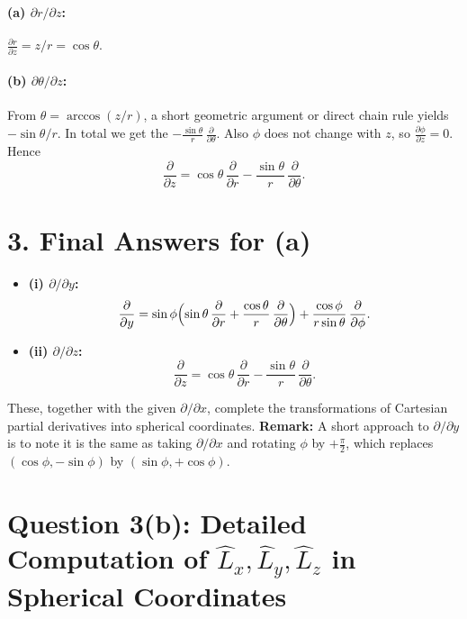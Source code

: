 \documentclass[12pt]{article}
\begin{document}
\paragraph{(a) $\partial r /\partial z$:}
\(
\frac{\partial r}{\partial z} = z/r = \cos\theta.
\)
\paragraph{(b) $\partial \theta /\partial z$:}
From $\theta = \arccos(z/r)$, a short geometric argument or direct chain rule yields $-\sin\theta /r$. In total we get the $-\frac{\sin\theta}{r}\,\frac{\partial}{\partial \theta}$. Also $\phi$ does not change with $z$, so $\frac{\partial \phi}{\partial z}=0$.
Hence
\[
\boxed{
\frac{\partial}{\partial z}
= \cos\theta\,\frac{\partial}{\partial r}
- \frac{\sin\theta}{r}\,\frac{\partial}{\partial \theta}.
}
\]

\section*{3. Final Answers for (a)}
\begin{itemize}
\item \textbf{(i) $\partial/\partial y$:}
\[
\frac{\partial}{\partial y}
= \sin\phi\Bigl(\sin\theta\,\frac{\partial}{\partial r} + \frac{\cos\theta}{r}\,\frac{\partial}{\partial \theta}\Bigr)
+ \frac{\cos\phi}{r\sin\theta}\,\frac{\partial}{\partial \phi}.
\]
\item \textbf{(ii) $\partial/\partial z$:}
\[
\frac{\partial}{\partial z}
= \cos\theta\,\frac{\partial}{\partial r}
- \frac{\sin\theta}{r}\,\frac{\partial}{\partial \theta}.
\]
\end{itemize}

These, together with the given $\partial/\partial x$, complete the transformations of Cartesian partial derivatives into spherical coordinates.\newline
\textbf{Remark:} A short approach to $\partial/\partial y$ is to note it is the same as taking $\partial/\partial x$ and rotating $\phi$ by $+\frac{\pi}{2}$, which replaces $(\cos\phi, -\sin\phi)$ by $(\sin\phi, +\cos\phi)$.








\section*{Question 3(b): Detailed Computation of $\hat{L}_x, \hat{L}_y, \hat{L}_z$ in Spherical Coordinates}
\end{document}
